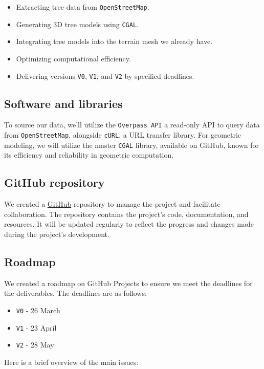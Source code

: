 \documentclass[12pt]{article}
\begin{document}
\begin{itemize}
    \item Extracting tree data from \texttt{OpenStreetMap}.
    \item Generating 3D tree models using \texttt{CGAL}.
    \item Integrating tree models into the terrain mesh we already have.
    \item Optimizing computational efficiency.
    \item Delivering versions \texttt{V0}, \texttt{V1}, and \texttt{V2} by specified deadlines.
\end{itemize}

\subsection{Software and libraries}
To source our data, we'll utilize the \texttt{Overpass API}\cite{overpass} a
read-only API to query data from \texttt{OpenStreetMap}, alongside
\texttt{cURL}\cite{curl}, a URL transfer library. For geometric modeling, we
will utilize the master \texttt{CGAL} library, available on
GitHub\cite{cgal-master}, known for its efficiency and reliability in geometric
computation.

\subsection{GitHub repository}
We created a \href{https://github.com/master-csmi/2024-m1-vegetation}{GitHub}
repository to manage the project and facilitate collaboration.
The repository contains the project's code, documentation, and resources.
It will be updated regularly to reflect the progress and changes made during
the project's development.

\subsection{Roadmap}
We created a roadmap on GitHub Projects to ensure we meet the deadlines for the
deliverables.
The deadlines are as follows:

\begin{itemize}
    \item \texttt{V0} - 26 March
    \item \texttt{V1} - 23 April
    \item \texttt{V2} - 28 May
\end{itemize}

Here is a brief overview of the main issues:
\end{document}
